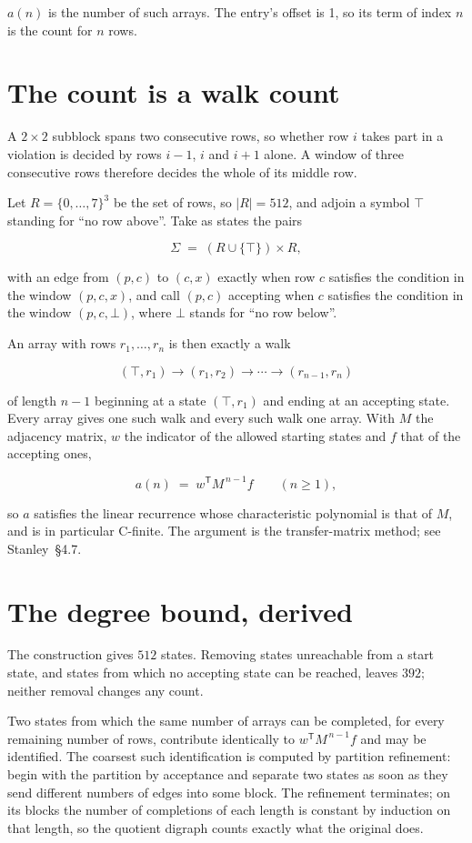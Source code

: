 \documentclass[11pt]{article}
\theoremstyle{definition}
\begin{document}
$a(n)$ is the number of such arrays. The entry's offset is 1, so its term of index $n$ is the count for $n$ rows.

\section{The count is a walk count}

A $2 \times 2$ subblock spans two consecutive rows, so whether row $i$ takes part in a violation is decided by rows $i-1$, $i$ and $i+1$ alone. A window of three consecutive rows therefore decides the whole of its middle row.

Let $R = \{0,\dots,7\}^{3}$ be the set of rows, so $|R| = 512$, and adjoin a symbol $\top$ standing for ``no row above''. Take as states the pairs

\[\Sigma \;=\; (R \cup \{\top\}) \times R,\]

with an edge from $(p,c)$ to $(c,x)$ exactly when row $c$ satisfies the condition in the window $(p,c,x)$, and call $(p,c)$ accepting when $c$ satisfies the condition in the window $(p,c,\bot)$, where $\bot$ stands for ``no row below''.

An array with rows $r_1,\dots,r_n$ is then exactly a walk

\[(\top,r_1) \to (r_1,r_2) \to \cdots \to (r_{n-1},r_n)\]

of length $n-1$ beginning at a state $(\top,r_1)$ and ending at an accepting state. Every array gives one such walk and every such walk one array. With $M$ the adjacency matrix, $w$ the indicator of the allowed starting states and $f$ that of the accepting ones,

\[a(n) \;=\; w^{\mathsf T} M^{\,n-1} f \qquad (n \ge 1),\]

so $a$ satisfies the linear recurrence whose characteristic polynomial is that of $M$, and is in particular C-finite. The argument is the transfer-matrix method; see Stanley~\S4.7.

\section{The degree bound, derived}

The construction gives $512$ states. Removing states unreachable from a start state, and states from which no accepting state can be reached, leaves $392$; neither removal changes any count.

Two states from which the same number of arrays can be completed, for every remaining number of rows, contribute identically to $w^{\mathsf T}M^{\,n-1}f$ and may be identified. The coarsest such identification is computed by partition refinement: begin with the partition by acceptance and separate two states as soon as they send different numbers of edges into some block. The refinement terminates; on its blocks the number of completions of each length is constant by induction on that length, so the quotient digraph counts exactly what the original does.
\end{document}
